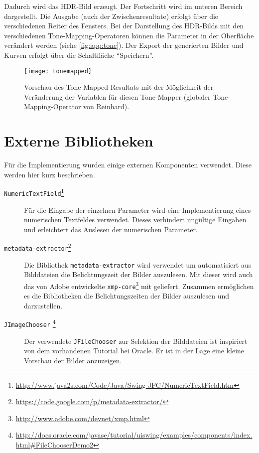 Dadurch wird das \gls{HDR}-Bild erzeugt. Der Fortschritt wird im unteren Bereich dargestellt. Die Ausgabe (auch der Zwischenresultate) erfolgt über die verschiedenen Reiter des Fensters. Bei der Darstellung des \gls{HDR}-Bilds mit den verschiedenen \gls{Tone-Mapping}-Operatoren können die Parameter in der Oberfläche verändert werden (siehe \autoref{fig:app:tone}). Der Export der generierten Bilder und Kurven erfolgt über die Schaltfläche \enquote{Speichern}.

\begin{figure}
  \begin{center}
    \texttt{[image: tonemapped]}
    \caption{Vorschau des Tone-Mapped Resultats mit der Möglichkeit der Veränderung der Variablen für diesen Tone-Mapper (globaler \gls{Tone-Mapping}-Operator von Reinhard).}
    \label{fig:app:tone}
  \end{center}
\end{figure}




\section{Externe Bibliotheken}
\label{externals}
Für die Implementierung wurden einige externen Komponenten verwendet. Diese werden hier kurz beschrieben.
\begin{description}
\item[\texttt{NumericTextField}\footnote{\url{http://www.java2s.com/Code/Java/Swing-JFC/NumericTextField.htm}}]
Für die Eingabe der einzelnen Parameter wird eine Implementierung eines numerischen Textfeldes verwendet. Dieses verhindert ungültige Eingaben und erleichtert das Auslesen der numerischen Parameter.

\item[\texttt{metadata-extractor}\footnote{\url{https://code.google.com/p/metadata-extractor/}}]
Die Bibliothek \texttt{metadata-extractor} wird verwendet um automatisiert aus Bilddateien die Belichtungszeit der Bilder auszulesen. Mit dieser wird auch das von Adobe entwickelte \texttt{xmp-core}\footnote{\url{http://www.adobe.com/devnet/xmp.html}} mit geliefert. Zusammen ermöglichen es die Bibliotheken die Belichtungszeiten der Bilder auszulesen und darzustellen.

\item[\texttt{JImageChooser} \footnote{\url{http://docs.oracle.com/javase/tutorial/uiswing/examples/components/index.html\#FileChooserDemo2}}]
Der verwendete \texttt{JFileChooser} zur Selektion der Bilddateien ist inspiriert von dem vorhandenen Tutorial bei Oracle. Er ist in der Lage eine kleine Vorschau der Bilder anzuzeigen.
\end{description}








